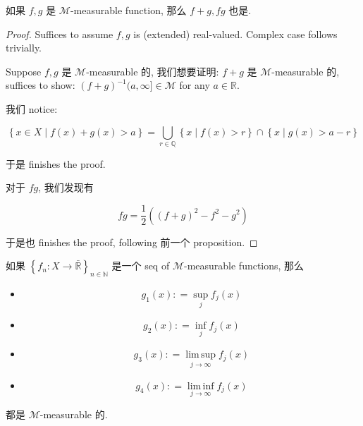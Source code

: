\begin{proposition}{}

如果 \(f,g\) 是 \(\mathcal{M}\)-measurable function, 那么 \(f + g,fg\) 也是.

\end{proposition}

\begin{proof}

Suffices to assume \(f,g\) is (extended) real-valued. Complex case follows trivially.

Suppose \(f,g\) 是 \(\mathcal{M}\)-measurable 的, 我们想要证明: \(f + g\) 是 \(\mathcal{M}\)-measurable 的, suffices to show: \((f + g)^{- 1}(a,\infty\rbrack \in \mathcal{M}\) for any \(a \in \mathbb{R}\).

我们 notice:

\[\left\{ {x \in X \mid f(x) + g(x) > a} \right\} = \bigcup\limits_{r \in \mathbb{Q}}\left\{ {x \mid f(x) > r} \right\} \cap \left\{ {x \mid g(x) > a - r} \right\}\]

于是 finishes the proof.

对于 \(fg\), 我们发现有

\[fg = \frac{1}{2}((f + g)^{2} - f^{2} - g^{2})\]

于是也 finishes the proof, following 前一个 proposition.

\end{proof}

\begin{lemma}{}

如果 \(\left\{ {f_{n}:X\rightarrow\bar{\mathbb{R}}} \right\}_{n \in \mathbb{N}}\) 是一个 seq of \(\mathcal{M}\)-measurable functions, 那么

\begin{itemize}
\tightlist
\item
  \[g_{1}(x): = \sup\limits_{j}f_{j}(x)\]
\item
  \[g_{2}(x): = \inf\limits_{j}f_{j}(x)\]
\item
  \[g_{3}(x): = \operatorname{lim\, sup}\limits_{j\rightarrow\infty}f_{j}(x)\]
\item
  \[g_{4}(x): = \operatorname{lim\, inf}\limits_{j\rightarrow\infty}f_{j}(x)\]
\end{itemize}

都是 \(\mathcal{M}\)-measurable 的.

\end{lemma}

